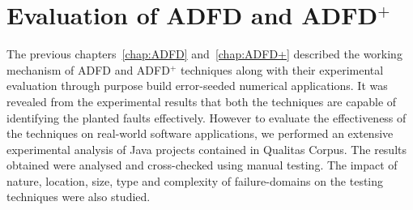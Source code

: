 
\chapter{Evaluation of ADFD and ADFD$^+$}
\label{chap:Evaluation}
	

The previous chapters~\ref{chap:ADFD} and~\ref{chap:ADFD+} described the working mechanism of ADFD and ADFD$^+$ techniques along with their experimental evaluation through purpose build error-seeded numerical applications. It was revealed from the experimental results that both the techniques are capable of identifying the planted faults effectively. However to evaluate the effectiveness of the techniques on real-world software applications, we performed an extensive experimental analysis of Java projects contained in Qualitas Corpus. The results obtained were analysed and cross-checked using manual testing. The impact of nature, location, size, type and complexity of failure-domains on the testing techniques were also studied. 





